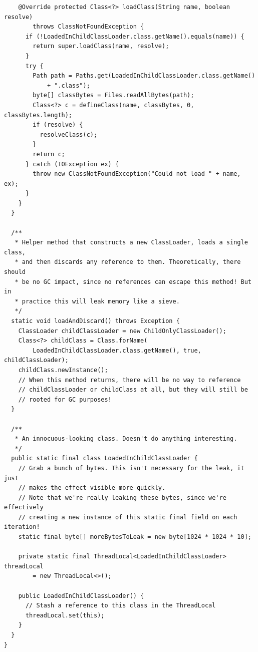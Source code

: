 \begin{lstlisting}
    @Override protected Class<?> loadClass(String name, boolean resolve)
        throws ClassNotFoundException {
      if (!LoadedInChildClassLoader.class.getName().equals(name)) {
        return super.loadClass(name, resolve);
      }
      try {
        Path path = Paths.get(LoadedInChildClassLoader.class.getName()
            + ".class");
        byte[] classBytes = Files.readAllBytes(path);
        Class<?> c = defineClass(name, classBytes, 0, classBytes.length);
        if (resolve) {
          resolveClass(c);
        }
        return c;
      } catch (IOException ex) {
        throw new ClassNotFoundException("Could not load " + name, ex);
      }
    }
  }
  
  /**
   * Helper method that constructs a new ClassLoader, loads a single class,
   * and then discards any reference to them. Theoretically, there should
   * be no GC impact, since no references can escape this method! But in
   * practice this will leak memory like a sieve.
   */
  static void loadAndDiscard() throws Exception {
    ClassLoader childClassLoader = new ChildOnlyClassLoader();
    Class<?> childClass = Class.forName(
        LoadedInChildClassLoader.class.getName(), true, childClassLoader);
    childClass.newInstance();
    // When this method returns, there will be no way to reference
    // childClassLoader or childClass at all, but they will still be
    // rooted for GC purposes!
  }

  /**
   * An innocuous-looking class. Doesn't do anything interesting.
   */
  public static final class LoadedInChildClassLoader {
    // Grab a bunch of bytes. This isn't necessary for the leak, it just
    // makes the effect visible more quickly.
    // Note that we're really leaking these bytes, since we're effectively
    // creating a new instance of this static final field on each iteration!
    static final byte[] moreBytesToLeak = new byte[1024 * 1024 * 10];
  
    private static final ThreadLocal<LoadedInChildClassLoader> threadLocal
        = new ThreadLocal<>();
    
    public LoadedInChildClassLoader() {
      // Stash a reference to this class in the ThreadLocal
      threadLocal.set(this);
    }
  }
}


\end{lstlisting}

